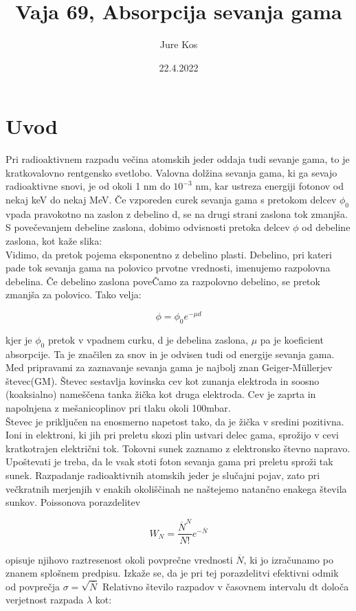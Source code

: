 \documentclass[a4paper]{report}
\author{Jure Kos}
\title{Vaja 69, Absorpcija sevanja gama}
\date{22.4.2022}
\begin{document}
\maketitle

\chapter*{Uvod}
Pri radioaktivnem razpadu večina atomskih jeder oddaja tudi sevanje gama, to je
kratkovalovno rentgensko svetlobo. Valovna dolžina sevanja gama, ki ga sevajo
radioaktivne snovi, je od okoli 1 nm do $10^{-3}$ nm, kar ustreza energiji fotonov od nekaj keV do nekaj MeV. Če vzporeden curek sevanja gama s pretokom delcev $\phi_0$vpada pravokotno na zaslon z debelino d, se na drugi strani zaslona tok zmanjša. S povečevanjem debeline zaslona, dobimo odvisnosti pretoka delcev $\phi$ od debeline zaslona, kot kaže slika:\\
Vidimo, da pretok pojema eksponentno z debelino plasti. Debelino, pri kateri pade
tok sevanja gama na polovico prvotne vrednosti, imenujemo razpolovna debelina. Če
debelino zaslona poveČamo za razpolovno debelino, se pretok zmanjša za polovico.
Tako velja:

\[\phi = \phi_0e^{-\mu d}\]

kjer je $\phi_0$ pretok v vpadnem curku, d je debelina zaslona, $\mu$ pa je koeficient absorpcije. Ta je značilen za snov in je odvisen tudi od energije sevanja gama. Med pripravami za zaznavanje sevanja gama je najbolj znan Geiger-Müllerjev števec(GM). Števec sestavlja kovinska cev kot zunanja elektroda in soosno (koaksialno) nameščena tanka žička kot druga elektroda. Cev je zaprta in napolnjena z mešanicoplinov pri tlaku okoli 100mbar.\\
Števec je priključen na enosmerno napetost tako, da je žička v sredini pozitivna.
Ioni in elektroni, ki jih pri preletu skozi plin ustvari delec gama, sprožijo v cevi kratkotrajen električni tok. Tokovni sunek zaznamo z elektronsko števno napravo. Upoštevati je treba, da le vsak stoti foton sevanja gama pri preletu sproži tak sunek. Razpadanje radioaktivnih atomskih jeder je slučajni pojav, zato pri večkratnih merjenjih v enakih okoliščinah ne naštejemo natančno enakega števila sunkov. Poissonova porazdelitev

\[W_N = \frac{\overline{N}^N}{N!}e^{-\overline{N}}\]

opisuje njihovo raztresenost okoli povprečne vrednosti $\overline{N}$, ki jo izračunamo po znanem splošnem predpisu. Izkaže se, da je pri tej porazdelitvi efektivni odmik od povprečja $\sigma = \sqrt{\overline{N}}$
Relativno število razpadov v časovnem intervalu dt določa verjetnost razpada $\lambda$ kot:
\end{document}

